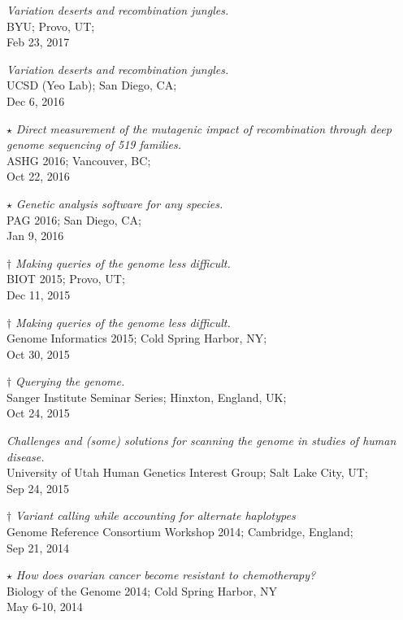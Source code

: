 \documentclass[margin,line]{cv}
\begin{document}
\begin{resume}
    \textit{Variation deserts and recombination jungles.} \\
    BYU; Provo, UT; \\
    Feb 23, 2017

    \textit{Variation deserts and recombination jungles.} \\
    UCSD (Yeo Lab); San Diego, CA; \\
    Dec 6, 2016

    $\star$ \textit{Direct measurement of the mutagenic impact of recombination through deep genome sequencing of 519 families.} \\
    ASHG 2016; Vancouver, BC; \\
    Oct 22, 2016

    $\star$ \textit{Genetic analysis software for any species.} \\
    PAG 2016; San Diego, CA; \\
    Jan 9, 2016

    $\dagger$ \textit{Making queries of the genome less difficult.} \\
    BIOT 2015; Provo, UT; \\
    Dec 11, 2015

    $\dagger$ \textit{Making queries of the genome less difficult.} \\
    Genome Informatics 2015; Cold Spring Harbor, NY; \\
    Oct 30, 2015

    $\dagger$ \textit{Querying the genome.} \\
    Sanger Institute Seminar Series; Hinxton, England, UK; \\
    Oct 24, 2015 

    \textit{Challenges and (some) solutions for scanning the genome in studies of human disease.} \\
    University of Utah Human Genetics Interest Group; Salt Lake City, UT; \\
    Sep 24, 2015

    $\dagger$ \textit{Variant calling while accounting for
    alternate haplotypes} \\
    Genome Reference Consortium Workshop 2014; Cambridge, England; \\
    Sep 21, 2014

    $\star$ \textit{How does ovarian cancer become resistant to chemotherapy?} \\
    Biology of the Genome 2014; Cold Spring Harbor, NY \\
    May 6-10, 2014


\end{resume}
\end{document}
